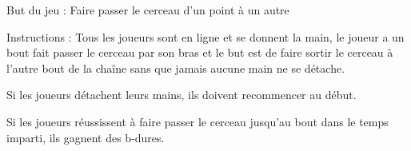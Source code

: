 \documentclass{grand-jeu}
\begin{document}
\begin{liste-materiel}
\end{liste-materiel}

\begin{regles} 
But du jeu : Faire passer le cerceau d’un point à un autre

\vspace{0.2cm}

Instructions : Tous les joueurs sont en ligne et se donnent la main, le joueur a un bout fait passer le cerceau par son bras et le but est de faire sortir le cerceau à l’autre bout de la chaîne sans que jamais aucune main ne se détache.

Si les joueurs détachent leurs mains, ils doivent recommencer au début.

Si les joueurs réussissent à faire passer le cerceau jusqu'au bout dans le temps imparti, ils gagnent des b-dures.
\end{regles}

\begin{moments-stop}
\end{moments-stop}
\end{document}
